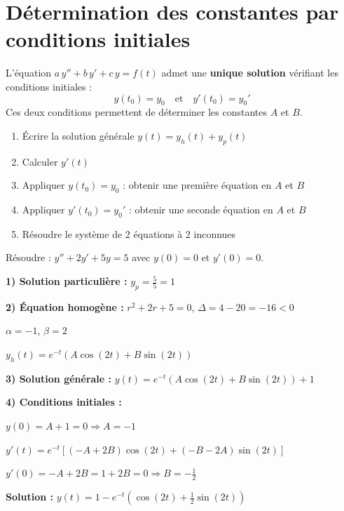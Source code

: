 \documentclass[a4paper,11pt]{article}
\begin{document}
\newpage
\section{Détermination des constantes par conditions initiales}

\begin{theoreme}
L'équation $a\,y'' + b\,y' + c\,y = f(t)$ admet une \textbf{unique solution} vérifiant les conditions initiales :
\[
y(t_0) = y_0 \quad \text{et} \quad y'(t_0) = y_0'
\]
Ces deux conditions permettent de déterminer les constantes $A$ et $B$.
\end{theoreme}

\begin{methode}[-- Détermination de $A$ et $B$]
\begin{enumerate}
  \item Écrire la solution générale $y(t) = y_h(t) + y_p(t)$
  \item Calculer $y'(t)$
  \item Appliquer $y(t_0) = y_0$ : obtenir une première équation en $A$ et $B$
  \item Appliquer $y'(t_0) = y_0'$ : obtenir une seconde équation en $A$ et $B$
  \item Résoudre le système de 2 équations à 2 inconnues
\end{enumerate}
\end{methode}

\begin{exemple}
Résoudre : $y'' + 2y' + 5y = 5$ avec $y(0) = 0$ et $y'(0) = 0$.

\textbf{1) Solution particulière :} $y_p = \frac{5}{5} = 1$

\textbf{2) Équation homogène :} $r^2 + 2r + 5 = 0$, $\Delta = 4 - 20 = -16 < 0$

$\alpha = -1$, $\beta = 2$

$y_h(t) = e^{-t}(A\cos(2t) + B\sin(2t))$

\textbf{3) Solution générale :} $y(t) = e^{-t}(A\cos(2t) + B\sin(2t)) + 1$

\textbf{4) Conditions initiales :}

$y(0) = A + 1 = 0 \Rightarrow A = -1$

$y'(t) = e^{-t}[(-A+2B)\cos(2t) + (-B-2A)\sin(2t)]$

$y'(0) = -A + 2B = 1 + 2B = 0 \Rightarrow B = -\frac{1}{2}$

\textbf{Solution :} $\displaystyle y(t) = 1 - e^{-t}\!\left(\cos(2t) + \frac{1}{2}\sin(2t)\right)$
\end{exemple}
\end{document}
